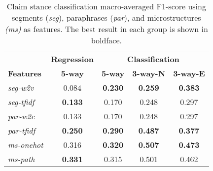 \begin{table}[t]
\begin{center}
{
\setlength{\tabcolsep}{5pt}
\begin{tabular}{l cccc}
\toprule
& \textbf{Regression} & \multicolumn{3}{c}{\textbf{Classification}}\\
\cmidrule(lr){2-2}\cmidrule(lr){3-5}
\textbf{Features} & \textbf{5-way} & \textbf{5-way} & \textbf{3-way-N} & \textbf{3-way-E} \\
\midrule
\emph{seg-w2v}    &      0.084  &      \textbf{0.230} &             \textbf{0.259}                     &   \textbf{0.383} \\
\emph{seg-tfidf}      &      \textbf{0.133}  &      0.170 &             0.248                     &   0.297 \\
\midrule
\emph{par-w2c}   &       0.133  &      0.170 &             0.248                     &   0.297 \\
\emph{par-tfidf} &       \textbf{0.250}  &      \textbf{0.290} &             \textbf{0.487}                     &   \textbf{0.377} \\
\midrule
\emph{ms-onehot} &       0.316  &     	\textbf{0.320} & 	\textbf{0.507}                    &   \textbf{0.473} \\
\emph{ms-path}  &  \textbf{0.331}  &     	0.315 &         	0.501                    &    0.462 \\
\bottomrule
\end{tabular}}
\caption{Claim stance classification macro-averaged F1-score using segments
	(\emph{seg}), paraphrases (\emph{par}), and microstructures \emph{(ms)}
	as features. The best result in each group is shown in boldface.}
\label{tab:microstructure_stance_experiment}
\end{center}
\end{table}

